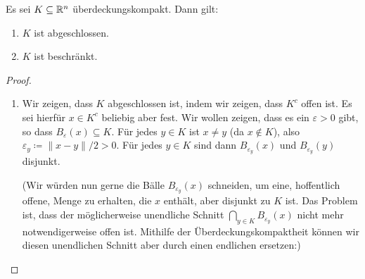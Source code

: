 \documentclass[a4paper,10pt]{article}
\begin{document}
\begin{lem}
 Es sei $K \subseteq \mathbb{R}^n$ überdeckungskompakt. Dann gilt:
 \begin{enumerate}
  \item
   $K$ ist abgeschlossen.
  \item
   $K$ ist beschränkt.
 \end{enumerate}
\end{lem}
\begin{proof}
 \begin{enumerate}
  \item
   Wir zeigen, dass $K$ abgeschlossen ist, indem wir zeigen, dass $K^c$ offen ist. Es sei hierfür $x \in K^c$ beliebig aber fest. Wir wollen zeigen, dass es ein $\varepsilon > 0$ gibt, so dass $B_\varepsilon(x) \subseteq K$. Für jedes $y \in K$ ist $x \neq y$ (da $x \notin K$), also $\varepsilon_y \coloneqq \|x-y\|/2 > 0$. Für jedes $y \in K$ sind dann $B_{\varepsilon_y}(x)$ und $B_{\varepsilon_y}(y)$ disjunkt.
   
   (Wir würden nun gerne die Bälle $B_{\varepsilon_y}(x)$ schneiden, um eine, hoffentlich offene, Menge zu erhalten, die $x$ enthält, aber disjunkt zu $K$ ist. Das Problem ist, dass der möglicherweise unendliche Schnitt $\bigcap_{y \in K} B_{\varepsilon_y}(x)$ nicht mehr notwendigerweise offen ist. Mithilfe der Überdeckungskompaktheit können wir diesen unendlichen Schnitt aber durch einen endlichen ersetzen:)
   

\end{enumerate}
\end{proof}
\end{document}
